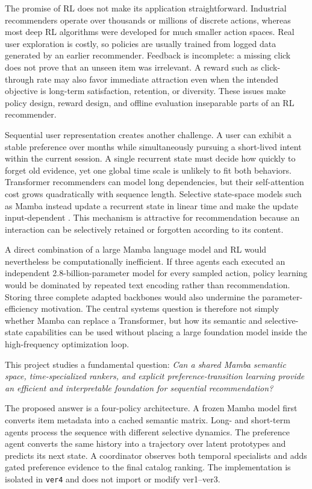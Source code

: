 \documentclass[11pt,a4paper]{article}
\begin{document}
The promise of RL does not make its application straightforward. Industrial recommenders operate over thousands or millions of discrete actions, whereas most deep RL algorithms were developed for much smaller action spaces. Real user exploration is costly, so policies are usually trained from logged data generated by an earlier recommender. Feedback is incomplete: a missing click does not prove that an unseen item was irrelevant. A reward such as click-through rate may also favor immediate attraction even when the intended objective is long-term satisfaction, retention, or diversity. These issues make policy design, reward design, and offline evaluation inseparable parts of an RL recommender.

Sequential user representation creates another challenge. A user can exhibit a stable preference over months while simultaneously pursuing a short-lived intent within the current session. A single recurrent state must decide how quickly to forget old evidence, yet one global time scale is unlikely to fit both behaviors. Transformer recommenders can model long dependencies, but their self-attention cost grows quadratically with sequence length. Selective state-space models such as Mamba instead update a recurrent state in linear time and make the update input-dependent \cite{MAMBA}. This mechanism is attractive for recommendation because an interaction can be selectively retained or forgotten according to its content.

A direct combination of a large Mamba language model and RL would nevertheless be computationally inefficient. If three agents each executed an independent 2.8-billion-parameter model for every sampled action, policy learning would be dominated by repeated text encoding rather than recommendation. Storing three complete adapted backbones would also undermine the parameter-efficiency motivation. The central systems question is therefore not simply whether Mamba can replace a Transformer, but how its semantic and selective-state capabilities can be used without placing a large foundation model inside the high-frequency optimization loop.

This project studies a fundamental question: \emph{Can a shared Mamba semantic
space, time-specialized rankers, and explicit preference-transition learning
provide an efficient and interpretable foundation for sequential recommendation?}

The proposed answer is a four-policy architecture. A frozen Mamba model first converts item metadata into a cached semantic matrix. Long- and short-term agents process the sequence with different selective dynamics. The preference agent converts the same history into a trajectory over latent prototypes and predicts its next state. A coordinator observes both temporal specialists and adds gated preference evidence to the final catalog ranking. The implementation is isolated in \texttt{ver4} and does not import or modify ver1--ver3.
\end{document}
